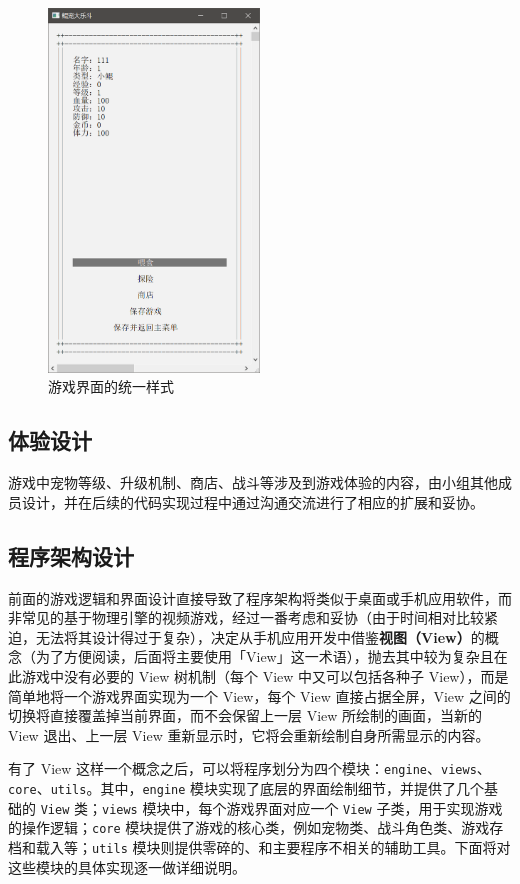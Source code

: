 \documentclass[a4paper, 11pt]{article}
\newcommand{\codeinline}{\texttt}
\begin{document}
\begin{figure}[htp]
	\centering\includegraphics[width=0.5\textwidth]{game_dashboard_view}
	\caption{游戏界面的统一样式}
	\label{fig:game_dashboard_view}
\end{figure}

\subsection{体验设计}

游戏中宠物等级、升级机制、商店、战斗等涉及到游戏体验的内容，由小组其他成员设计，并在后续的代码实现过程中通过沟通交流进行了相应的扩展和妥协。

\subsection{程序架构设计}

前面的游戏逻辑和界面设计直接导致了程序架构将类似于桌面或手机应用软件，而非常见的基于物理引擎的视频游戏，经过一番考虑和妥协（由于时间相对比较紧迫，无法将其设计得过于复杂），决定从手机应用开发中借鉴\textbf{视图（View）}的概念（为了方便阅读，后面将主要使用「View」这一术语），抛去其中较为复杂且在此游戏中没有必要的 View 树机制（每个 View 中又可以包括各种子 View），而是简单地将一个游戏界面实现为一个 View，每个 View 直接占据全屏，View 之间的切换将直接覆盖掉当前界面，而不会保留上一层 View 所绘制的画面，当新的 View 退出、上一层 View 重新显示时，它将会重新绘制自身所需显示的内容。

有了 View 这样一个概念之后，可以将程序划分为四个模块：\codeinline{engine}、\codeinline{views}、\codeinline{core}、\codeinline{utils}。其中，\codeinline{engine} 模块实现了底层的界面绘制细节，并提供了几个基础的 \codeinline{View} 类；\codeinline{views} 模块中，每个游戏界面对应一个 \codeinline{View} 子类，用于实现游戏的操作逻辑；\codeinline{core} 模块提供了游戏的核心类，例如宠物类、战斗角色类、游戏存档和载入等；\codeinline{utils} 模块则提供零碎的、和主要程序不相关的辅助工具。下面将对这些模块的具体实现逐一做详细说明。
\end{document}
